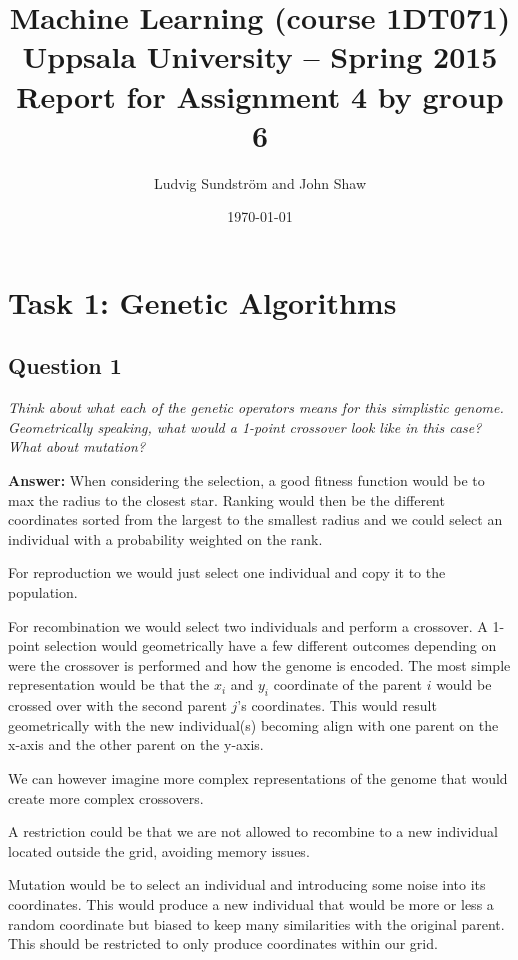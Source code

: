 \documentclass[a4paper]{article}
\title{Machine Learning (course 1DT071)
Uppsala University – Spring 2015
Report for Assignment 4 by group 6}
\author{Ludvig Sundstr\"{o}m and John Shaw}
\date{\today}
\begin{document}
\maketitle

\section*{Task 1: Genetic Algorithms}

\subsection*{Question 1} 

\emph{Think about what each of the genetic operators means for this
simplistic genome. Geometrically speaking, what would a 1-point crossover look like in this case? What about mutation?}

\textbf{Answer:} When considering the selection, a good fitness function would be to max the radius to the closest star. Ranking would then be the different coordinates sorted from the largest to the smallest radius and we could select an individual with a probability weighted on the rank. 

For reproduction we would just select one individual and copy it to the population.

For recombination we would select two individuals and perform a crossover. A 1-point selection would geometrically have a few different outcomes depending on were the crossover is performed and how the genome is encoded. The most simple representation would be that the $x_i$ and $y_i$ coordinate of the parent $i$ would be crossed over with the second parent $j$'s coordinates. This would result geometrically with the new individual(s) becoming align with one parent on the x-axis and the other parent on the y-axis. 

We can however imagine more complex representations of the genome that would create more complex crossovers.

A restriction could be that we are not allowed to recombine to a new individual located outside the grid, avoiding memory issues.

Mutation would be to select an individual and introducing some noise into its coordinates. This would produce a new individual that would be more or less a random coordinate but biased to keep many similarities with the original parent. This should be restricted to only produce coordinates within our grid. 
\end{document}
